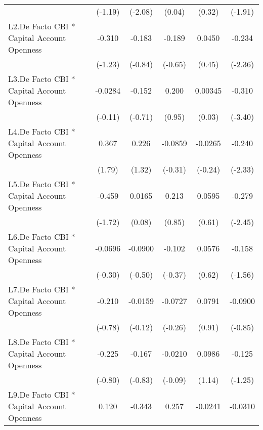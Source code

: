 {\begin{longtable}{l*{5}{c}}
                &  (-1.19)         &  (-2.08)         &   (0.04)         &   (0.32)         &  (-1.91)         \\
[1em]
L2.De Facto CBI * Capital Account Openness&   -0.310         &   -0.183         &   -0.189         &   0.0450         &   -0.234\sym{*}  \\
                &  (-1.23)         &  (-0.84)         &  (-0.65)         &   (0.45)         &  (-2.36)         \\
[1em]
L3.De Facto CBI * Capital Account Openness&  -0.0284         &   -0.152         &    0.200         &  0.00345         &   -0.310\sym{***}\\
                &  (-0.11)         &  (-0.71)         &   (0.95)         &   (0.03)         &  (-3.40)         \\
[1em]
L4.De Facto CBI * Capital Account Openness&    0.367         &    0.226         &  -0.0859         &  -0.0265         &   -0.240\sym{*}  \\
                &   (1.79)         &   (1.32)         &  (-0.31)         &  (-0.24)         &  (-2.33)         \\
[1em]
L5.De Facto CBI * Capital Account Openness&   -0.459         &   0.0165         &    0.213         &   0.0595         &   -0.279\sym{*}  \\
                &  (-1.72)         &   (0.08)         &   (0.85)         &   (0.61)         &  (-2.45)         \\
[1em]
L6.De Facto CBI * Capital Account Openness&  -0.0696         &  -0.0900         &   -0.102         &   0.0576         &   -0.158         \\
                &  (-0.30)         &  (-0.50)         &  (-0.37)         &   (0.62)         &  (-1.56)         \\
[1em]
L7.De Facto CBI * Capital Account Openness&   -0.210         &  -0.0159         &  -0.0727         &   0.0791         &  -0.0900         \\
                &  (-0.78)         &  (-0.12)         &  (-0.26)         &   (0.91)         &  (-0.85)         \\
[1em]
L8.De Facto CBI * Capital Account Openness&   -0.225         &   -0.167         &  -0.0210         &   0.0986         &   -0.125         \\
                &  (-0.80)         &  (-0.83)         &  (-0.09)         &   (1.14)         &  (-1.25)         \\
[1em]
L9.De Facto CBI * Capital Account Openness&    0.120         &   -0.343         &    0.257         &  -0.0241         &  -0.0310         \\

\end{longtable}}
